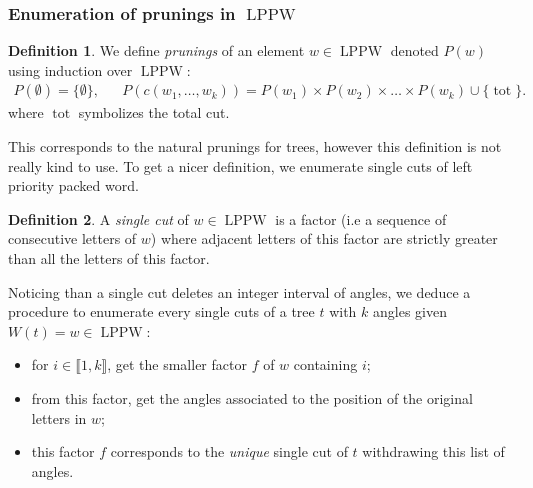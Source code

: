 \documentclass[a4paper,10pt]{amsart}
\DeclareMathOperator{\tot}{tot}
\DeclareMathOperator{\LPPW}{LPPW}
\newcommand{\IEM}[2]{\llbracket #1,#2 \rrbracket}
\theoremstyle{definition}
\newtheorem{defi}{Definition}
\begin{document}
\subsubsection{Enumeration of prunings in $\LPPW$} \label{sec:cuts}

\begin{defi}
	We define \emph{prunings} of an element $w\in\LPPW$ denoted $P(w)$ using induction over $\LPPW$:
	\begin{align*}
		P(\emptyset)=\{\emptyset\}, && P(c(w_1,\dots,w_k))=P(w_1)\times P(w_2)\times \dots \times P(w_k) \cup \{ \tot \}. 
	\end{align*}
	where $\tot$ symbolizes the total cut.  
\end{defi}
This corresponds to the natural prunings for trees, however this definition is not really kind to use. To get a nicer definition, we enumerate single cuts of left priority packed word.
\begin{defi}
	A \emph{single cut} of $w\in\LPPW$ is a factor (i.e a sequence of consecutive letters of $w$) where adjacent letters of this factor are strictly greater than all the letters of this factor. 
\end{defi}
Noticing than a single cut deletes an integer interval of angles, we deduce a procedure to enumerate every single cuts of a tree $t$ with $k$ angles given $W(t)=w\in\LPPW$:
\begin{itemize}
	\item for $i\in\IEM1k$, get the smaller factor $f$ of $w$ containing $i$;
	\item from this factor, get the angles associated to the position of the original letters in $w$;
	\item this factor $f$ corresponds to the \emph{unique} single cut of $t$ withdrawing this list of angles.
\end{itemize}
\end{document}
